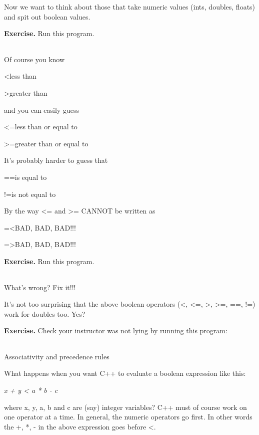 \documentclass[
]{article}
\begin{document}
Now we want to think about those that take numeric values (ints,
doubles, floats) and spit out boolean values.

\textbf{Exercise.} Run this program.

\begin{longtable}[]{@{}@{}}
\toprule
\endhead
\bottomrule
\end{longtable}

Of course you know

\textless less than

\textgreater greater than

and you can easily guess

\textless=less than or equal to

\textgreater=greater than or equal to

It's probably harder to guess that

==is equal to

!=is not equal to

By the way \textless= and \textgreater= CANNOT be written as

=\textless BAD, BAD, BAD!!!

=\textgreater BAD, BAD, BAD!!!

\textbf{Exercise.} Run this program.

\begin{longtable}[]{@{}@{}}
\toprule
\endhead
\bottomrule
\end{longtable}

What's wrong? Fix it!!!

It's not too surprising that the above boolean operators (\textless,
\textless=, \textgreater, \textgreater=, ==, !=) work for doubles too.
Yes?

\textbf{Exercise.} Check your instructor was not lying by running this
program:

\begin{longtable}[]{@{}@{}}
\toprule
\endhead
\bottomrule
\end{longtable}

Associativity and precedence rules

What happens when you want C++ to evaluate a boolean expression like
this:

\emph{x + y \textless{} a * b - c}

where x, y, a, b and c are (say) integer variables? C++ must of course
work on one operator at a time. In general, the numeric operators go
first. In other words the +, *, - in the above expression goes before
\textless.
\end{document}
